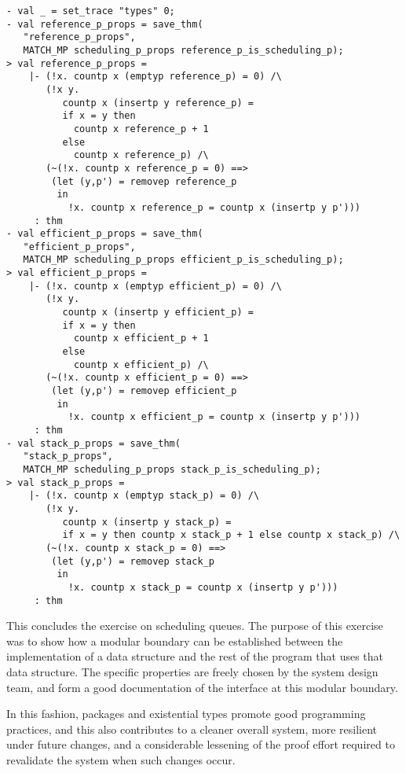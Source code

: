 \begin{session}
\begin{verbatim}
- val _ = set_trace "types" 0;
- val reference_p_props = save_thm(
   "reference_p_props",
   MATCH_MP scheduling_p_props reference_p_is_scheduling_p);
> val reference_p_props =
    |- (!x. countp x (emptyp reference_p) = 0) /\
       (!x y.
          countp x (insertp y reference_p) =
          if x = y then
            countp x reference_p + 1
          else
            countp x reference_p) /\
       (~(!x. countp x reference_p = 0) ==>
        (let (y,p') = removep reference_p
         in
           !x. countp x reference_p = countp x (insertp y p')))
     : thm
- val efficient_p_props = save_thm(
   "efficient_p_props",
   MATCH_MP scheduling_p_props efficient_p_is_scheduling_p);
> val efficient_p_props =
    |- (!x. countp x (emptyp efficient_p) = 0) /\
       (!x y.
          countp x (insertp y efficient_p) =
          if x = y then
            countp x efficient_p + 1
          else
            countp x efficient_p) /\
       (~(!x. countp x efficient_p = 0) ==>
        (let (y,p') = removep efficient_p
         in
           !x. countp x efficient_p = countp x (insertp y p')))
     : thm
- val stack_p_props = save_thm(
   "stack_p_props",
   MATCH_MP scheduling_p_props stack_p_is_scheduling_p);
> val stack_p_props =
    |- (!x. countp x (emptyp stack_p) = 0) /\
       (!x y.
          countp x (insertp y stack_p) =
          if x = y then countp x stack_p + 1 else countp x stack_p) /\
       (~(!x. countp x stack_p = 0) ==>
        (let (y,p') = removep stack_p
         in
           !x. countp x stack_p = countp x (insertp y p')))
     : thm
\end{verbatim}
\end{session}

This concludes the exercise on scheduling queues. The purpose of this
exercise was to show how a modular boundary can be established
between the implementation of a data structure and the rest of the
program that uses that data structure. The specific properties
are freely chosen by the system design team, and form a good
documentation of the interface at this modular boundary.

In this fashion, packages and existential types promote good
programming practices, and this also contributes to a cleaner
overall system, more resilient under future changes, and a
considerable lessening of the proof effort required to
revalidate the system when such changes occur.






